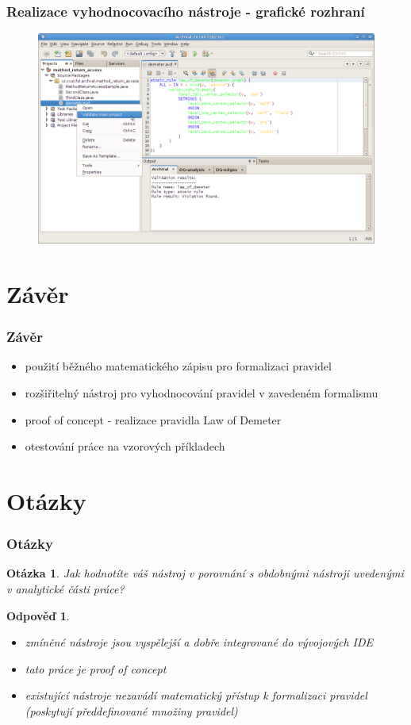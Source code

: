 \documentclass{beamer}
\newtheorem*{question}{Otázka}
\newtheorem*{response}{Odpověď}
\begin{document}
\begin{frame}
  \frametitle{Realizace vyhodnocovacího nástroje - grafické rozhraní}
    \begin{figure}[h!]
      \centering
      \includegraphics[width=1.0\textwidth]{./figures/archval.png}
    \end{figure}
\end{frame}

\section{Závěr}
\begin{frame}
  \frametitle{Závěr}
  \begin{itemize}
  \item použití běžného matematického zápisu pro formalizaci pravidel
  \item rozšiřitelný nástroj pro vyhodnocování pravidel v zavedeném formalismu
  \item proof of concept - realizace pravidla Law of Demeter
  \item otestování práce na vzorových příkladech
  \end{itemize}
\end{frame}

\section{Otázky}
\begin{frame}
  \frametitle{Otázky}
  \begin{question}
    Jak hodnotíte váš nástroj v porovnání s obdobnými nástroji uvedenými v analytické části práce?
  \end{question}
  \begin{response}
    \begin{itemize}
    \item zmíněné nástroje jsou vyspělejší a dobře integrované do vývojových IDE
    \item tato práce je \emph{proof of concept}
    \item existující nástroje nezavádí matematický přístup k formalizaci pravidel (poskytují předdefinované množiny pravidel)
    \end{itemize}
  \end{response}
\end{frame}
\end{document}
